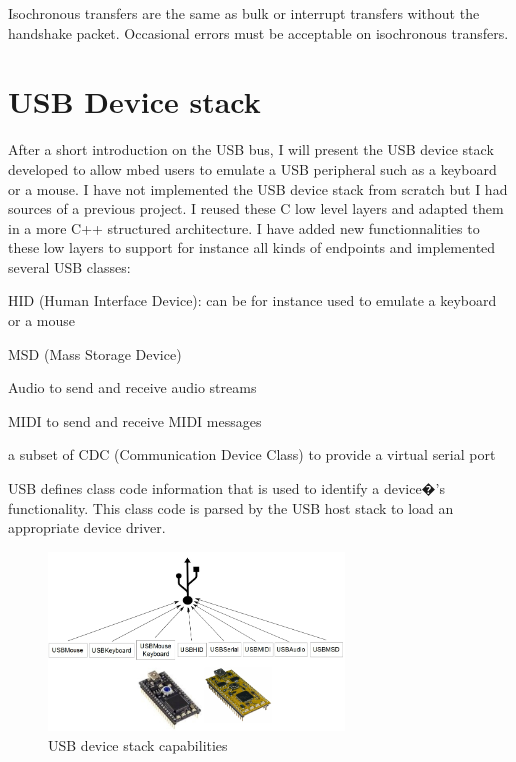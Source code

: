 \documentclass[pdftex,10pt,a4paper]{report}
\newenvironment{packed_item}{
\begin{itemize}
  \setlength{\itemsep}{1pt}
  \setlength{\parskip}{0pt}
  \setlength{\parsep}{0pt}
}{\end{itemize}}
\begin{document}
Isochronous transfers are the same as bulk or interrupt transfers without the handshake packet. Occasional errors must be acceptable on isochronous transfers.



\newpage
\section{USB Device stack}
After a short introduction on the USB bus, I will present the USB device stack developed to allow mbed users to emulate a USB peripheral such as a keyboard or a mouse. I have not implemented the USB device stack from scratch but I had sources of a previous project. I reused these C low level layers and adapted them in a more C++ structured architecture. I have added new functionnalities to these low layers to support for instance all kinds of endpoints and implemented several USB classes:
\begin{packed_item}
	\item HID (Human Interface Device): can be for instance used to emulate a keyboard or a mouse
	\item MSD (Mass Storage Device)
	\item Audio to send and receive audio streams
	\item MIDI to send and receive MIDI messages
	\item a subset of CDC (Communication Device Class) to provide a virtual serial port
\end{packed_item}

USB defines class code information that is used to identify a device�'s functionality. This class code is parsed by the USB host stack to load an appropriate device driver.

\begin{figure}[h!]
		\centering
		\includegraphics[width=0.7\textwidth]{./usb_capa1.jpg}
		\caption{USB device stack capabilities}
		\label{USB device stack capabilities}
\end{figure}
\end{document}
